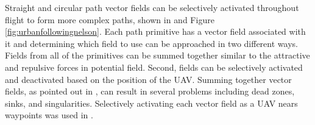\documentclass[numbered,pdftex]{ohio-etd}
\begin{document}


%
%

Straight and circular path vector fields can be selectively activated throughout flight to form more complex paths, shown in \cite{nelson_cooperative_2005,nelson_vector_2006,nelson_vector_2007,jung_unmanned_2016} and Figure \ref{fig:urbanfollowingnelson}. Each path primitive has a vector field associated with it and determining which field to use can be approached in two different ways. Fields from all of the primitives can be summed together similar to the attractive and repulsive forces in potential field. Second, fields can be selectively activated and deactivated based on the position of the UAV. Summing together vector fields, as pointed out in \cite{nelson_cooperative_2005}, can result in several problems including dead zones, sinks, and singularities. Selectively activating each vector field as a UAV nears waypoints was used in \cite{nelson_cooperative_2005,nelson_vector_2006,nelson_vector_2007,jung_unmanned_2016}.
\end{document}
